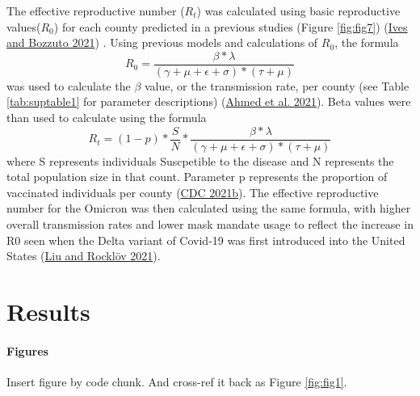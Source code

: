 \documentclass[
  12pt,
]{article}
\begin{document}
The effective reproductive number (\(R_t\)) was calculated using basic reproductive values(\(R_0\)) for each county predicted in a previous studies (Figure \ref{fig:fig7}) (\protect\hyperlink{ref-ives_estimating_2021}{Ives and Bozzuto 2021}) . Using previous models and calculations of \(R_0\), the formula
\[R_0 = \frac{\beta*\lambda}{(\gamma+\mu+\epsilon+\sigma)*(\tau+\mu)}\]
was used to calculate the \(\beta\) value, or the transmission rate, per county (see Table \ref{tab:suptable1} for parameter descriptions) (\protect\hyperlink{ref-ahmed_mathematical_2021}{Ahmed et al. 2021}). Beta values were than used to calculate using the formula
\[R_t = (1-p)*\frac{S}{N}*\frac{\beta*\lambda}{(\gamma+\mu+\epsilon+\sigma)*(\tau+\mu)}\]
where S represents individuals Suscpetible to the disease and N represents the total population size in that count. Parameter p represents the proportion of vaccinated individuals per county (\protect\hyperlink{ref-cdc_covid-19_2021}{CDC 2021b}). The effective reproductive number for the Omicron was then calculated using the same formula, with higher overall transmission rates and lower mask mandate usage to reflect the increase in R0 seen when the Delta variant of Covid-19 was first introduced into the United States (\protect\hyperlink{ref-liu_reproductive_2021}{Liu and Rocklöv 2021}).

\hypertarget{results}{%
\section{Results}\label{results}}

\hypertarget{figures}{%
\paragraph{Figures}\label{figures}}

Insert figure by code chunk. And cross-ref it back as Figure \ref{fig:fig1}.
\end{document}
